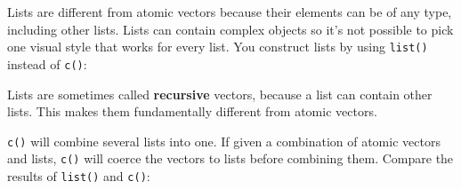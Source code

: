 \documentclass[]{book}
\newenvironment{Shaded}{\begin{snugshade}}{\end{snugshade}}
\newcommand{\KeywordTok}[1]{\textcolor[rgb]{0.13,0.29,0.53}{\textbf{#1}}}
\newcommand{\DecValTok}[1]{\textcolor[rgb]{0.00,0.00,0.81}{#1}}
\newcommand{\FloatTok}[1]{\textcolor[rgb]{0.00,0.00,0.81}{#1}}
\newcommand{\StringTok}[1]{\textcolor[rgb]{0.31,0.60,0.02}{#1}}
\newcommand{\CommentTok}[1]{\textcolor[rgb]{0.56,0.35,0.01}{\textit{#1}}}
\newcommand{\OtherTok}[1]{\textcolor[rgb]{0.56,0.35,0.01}{#1}}
\newcommand{\OperatorTok}[1]{\textcolor[rgb]{0.81,0.36,0.00}{\textbf{#1}}}
\newcommand{\NormalTok}[1]{#1}
\theoremstyle{definition}
\theoremstyle{definition}
\theoremstyle{definition}
\theoremstyle{remark}
\begin{document}
Lists are different from atomic vectors because their elements can be of
any type, including other lists. Lists can contain complex objects so
it's not possible to pick one visual style that works for every list.
You construct lists by using \texttt{list()} instead of \texttt{c()}:

\begin{Shaded}
\end{Shaded}

Lists are sometimes called \textbf{recursive} vectors, because a list
can contain other lists. This makes them fundamentally different from
atomic vectors.

\begin{Shaded}
\end{Shaded}

\texttt{c()} will combine several lists into one. If given a combination
of atomic vectors and lists, \texttt{c()} will coerce the vectors to
lists before combining them. Compare the results of \texttt{list()} and
\texttt{c()}:

\begin{Shaded}
\end{Shaded}
\end{document}
